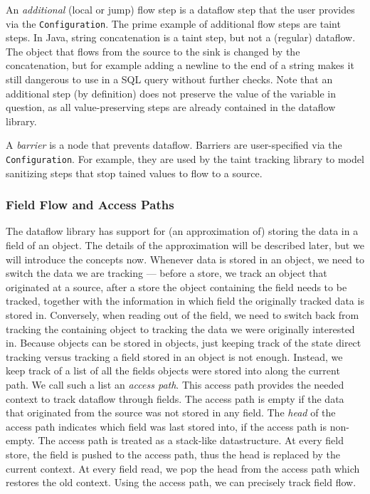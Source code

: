 An \emph{additional} (local or jump) flow step is a dataflow step that the user 
provides via the \texttt{Configuration}.
The prime example of additional flow steps are taint steps.
In Java, string concatenation is a taint step, but not a (regular) dataflow.
The object that flows from the source to the sink is changed by the concatenation,
but for example adding a newline to the end of a string makes it still dangerous
to use in a SQL query without further checks.
Note that an additional step (by definition) does not preserve the value of the
variable in question, as all value-preserving steps are already contained in the
dataflow library.

A \emph{barrier} is a node that prevents dataflow.
Barriers are user-specified via the \texttt{Configuration}.
For example, they are used by the taint tracking library to model sanitizing steps
that stop tained values to flow to a source.


\subsubsection*{Field Flow and Access Paths}
The dataflow library has support for (an approximation of) storing the data in a
field of an object. The details of the approximation will be described later, but
we will introduce the concepts now.
Whenever data is stored in an object, we need to switch the data we are tracking ---
before a store, we track an object that originated at a source, after a store the object
containing the field needs to be tracked, together with the information in which
field the originally tracked data is stored in.
Conversely, when reading out of the field, we need to switch back from tracking
the containing object to tracking the data we were originally interested in.
Because objects can be stored in objects, just keeping track of the state 
direct tracking versus tracking a field stored in an object is not enough.
Instead, we keep track of a list of all the fields objects were stored into along 
the current path.
We call such a list an \emph{access path}.
This access path provides the needed context to track dataflow through fields.
The access path is empty if the data that originated from the source was not 
stored in any field.
The \emph{head} of the access path indicates which field was last stored into,
if the access path is non-empty.
The access path is treated as a stack-like datastructure.
At every field store, the field is pushed to the access path, thus the head is
replaced by the current context.
At every field read, we pop the head from the access path which restores the old context.
Using the access path, we can precisely track field flow.


